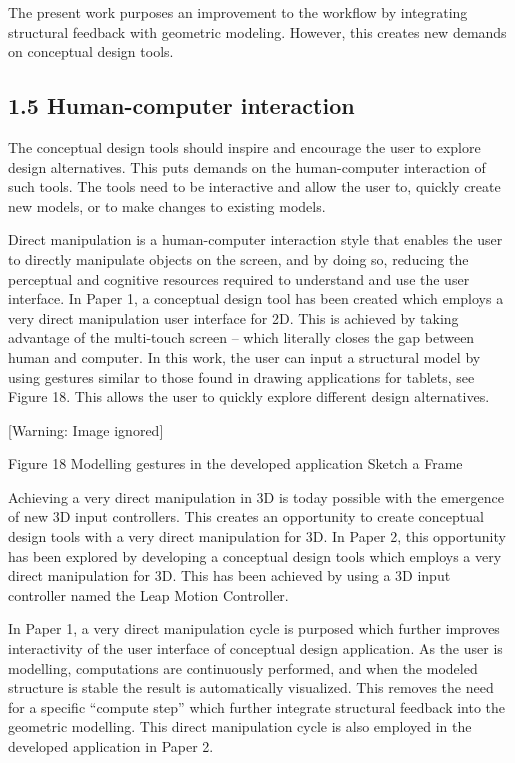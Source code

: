 The present work purposes an improvement to the workflow by integrating structural feedback with geometric modeling. However, this creates new demands on conceptual design tools. 

\subsection[1.5 Human{}-computer interaction]{1.5 Human-computer interaction}
The conceptual design tools should inspire and encourage the user to explore design alternatives. This puts demands on the human-computer interaction of such tools. The tools need to be interactive and allow the user to, quickly create new models, or to make changes to existing models. 



Direct manipulation is a human-computer interaction style that enables the user to directly manipulate objects on the screen, and by doing so, reducing the perceptual and cognitive resources required to understand and use the user interface. In Paper 1, a conceptual design tool has been created which employs a very direct manipulation user interface for 2D. This is achieved by taking advantage of the multi-touch screen – which literally closes the gap between human and computer. In this work, the user can input a structural model by using gestures similar to those found in drawing applications for tablets, see Figure 18. This allows the user to quickly explore different design alternatives.



  [Warning: Image ignored] %
 

Figure 18 Modelling gestures in the developed application Sketch a Frame



Achieving a very direct manipulation in 3D is today possible with the emergence of new 3D input controllers. This creates an opportunity to create conceptual design tools with a very direct manipulation for 3D. In Paper 2, this opportunity has been explored by developing a conceptual design tools which employs a very direct manipulation for 3D. This has been achieved by using a 3D input controller named the Leap Motion Controller. 



In Paper 1, a very direct manipulation cycle is purposed which further improves interactivity of the user interface of conceptual design application. As the user is modelling, computations are continuously performed, and when the modeled structure is stable the result is automatically visualized. This removes the need for a specific “compute step” which further integrate structural feedback into the geometric modelling. This direct manipulation cycle is also employed in the developed application in Paper 2.

